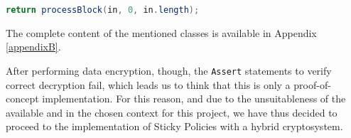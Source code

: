 \lstinline[language=java]!return processBlock(in, 0, in.length);!

The complete content of the mentioned classes is available in Appendix \ref{appendixB}.

After performing data encryption, though, the \texttt{Assert} statements to verify correct decryption fail, which leads us to think that this is only a proof-of-concept implementation. For this reason, and due to the unsuitableness of the available \cite{bethencourt2011library} and \cite{PBC2007Lynn} in the chosen context for this project, we have thus decided to proceed to the implementation of Sticky Policies with a hybrid cryptosystem.